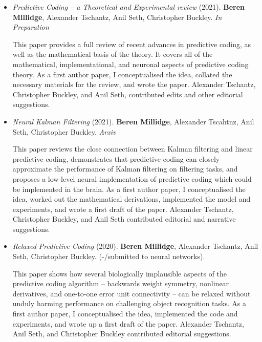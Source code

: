 \begin{itemize}

\item \emph{Predictive Coding -- a Theoretical and Experimental review} (2021). \textbf{Beren Millidge}, Alexander Tschantz, Anil Seth, Christopher Buckley. \emph{In Preparation}

This paper provides a full review of  recent advances in predictive coding, as well as the mathematical basis of the theory. It covers all of the mathematical, implementational, and neuronal aspects of predictive coding theory. As a first author paper, I conceptualised the idea, collated the necessary materials for the review, and wrote the paper. Alexander Tschantz, Christopher Buckley, and Anil Seth, contributed edits and other editorial suggestions.

\item  \emph{Neural Kalman Filtering} (2021). \textbf{Beren Millidge}, Alexander Tscahtnz, Anil Seth, Christopher Buckley. \emph{Arxiv}

This paper reviews the close connection between Kalman filtering and linear predictive coding, demonstrates that predictive coding can closely approximate the performance of Kalman filtering on filtering tasks, and proposes a low-level neural implementation of predictive coding which could be implemented in the brain. As a first author paper, I conceptualised the idea, worked out the mathematical derivations, implemented the model and experiments, and wrote a first draft of the paper. Alexander Tschantz, Christopher Buckley, and Anil Seth contributed editorial and narrative suggestions.

\item  \emph{Relaxed Predictive Coding} (2020). \textbf{Beren Millidge}, Alexander Tschantz, Anil Seth, Christopher Buckley. (-/submitted to neural networks). 

This paper shows how several biologically implausible aspects of the predictive coding algorithm -- backwards weight symmetry, nonlinear derivatives, and one-to-one error unit connectivity -- can be relaxed without unduly harming performance on challenging object recognition tasks. As a first author paper, I conceptualised the idea, implemented the code and experiments, and wrote up a first draft of the paper. Alexander Tschantz, Anil Seth, and Christopher Buckley contributed editorial suggestions.



\end{itemize}
